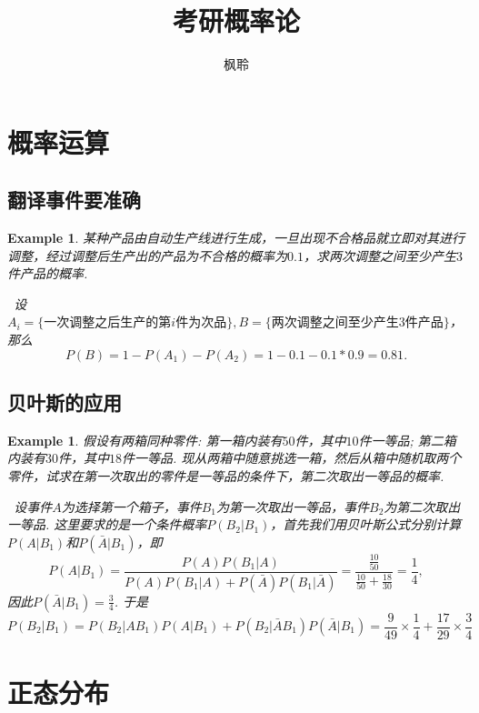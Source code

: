 \documentclass{article}
\newtheorem{example}[theorem]{Example}
\newcommand{\hints}{{\color{blue} \text{hints}}}
\begin{document}
\title{考研概率论}
\author{枫聆}
\maketitle

\tableofcontents

\newpage
\section{概率运算}

\subsection{翻译事件要准确}

\begin{example}
\rm 某种产品由自动生产线进行生成，一旦出现不合格品就立即对其进行调整，经过调整后生产出的产品为不合格的概率为$0.1$，求两次调整之间至少产生$3$件产品的概率. 

\hints\ 设$A_i = \{\text{一次调整之后生产的第$i$件为次品}\}, B=\{\text{两次调整之间至少产生$3$件产品}\}$，那么
$$
P(B) =  1- P(A_1) - P(A_2) = 1-0.1-0.1*0.9 = 0.81. 
$$
\end{example}

\subsection{贝叶斯的应用}

\begin{example}
\rm 假设有两箱同种零件: 第一箱内装有$50$件，其中$10$件一等品; 第二箱内装有$30$件，其中$18$件一等品. 现从两箱中随意挑选一箱，然后从箱中随机取两个零件，试求在第一次取出的零件是一等品的条件下，第二次取出一等品的概率.

\hints\ 设事件$A$为选择第一个箱子，事件$B_1$为第一次取出一等品，事件$B_2$为第二次取出一等品. 这里要求的是一个条件概率$P(B_2|B_1)$，首先我们用贝叶斯公式分别计算$P(A|B_1)$和$P(\bar{A}|B_1)$，即
$$
P(A|B_1) = \frac{P(A)P(B_1|A)}{P(A)P(B_1|A) + P(\bar{A})P(B_1|\bar{A})} = \frac{\frac{10}{50}}{\frac{10}{50} + \frac{18}{30}} = \frac{1}{4},
$$ 
因此$P(\bar{A}|B_1) = \frac{3}{4}$. 于是
$$
P(B_2|B_1) = P(B_2|AB_1)P(A|B_1) + P(B_2|\bar{A}B_1)P(\bar{A}|B_1) = \frac{9}{49}\times\frac{1}{4} + \frac{17}{29} \times \frac{3}{4}
$$
\end{example}

\newpage
\section{正态分布}
\end{document}
